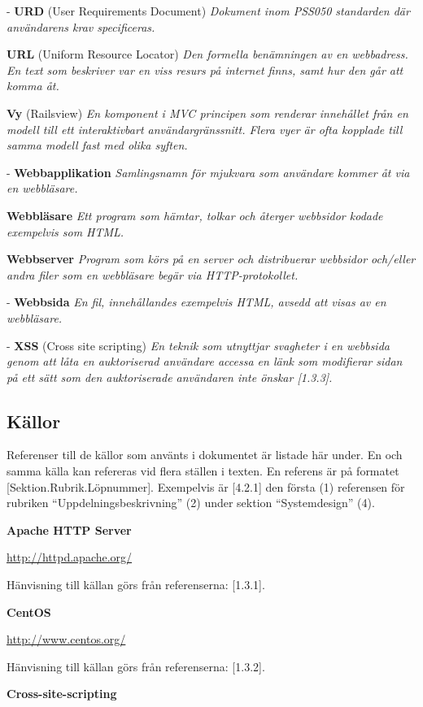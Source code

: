 \documentclass[a4paper, twoside, 11pt, titlepage]{article}
\begin{document}
	- \textbf{URD} (User Requirements Document) \emph{Dokument inom PSS050 standarden där användarens krav specificeras.}

	\textbf{URL} (Uniform Resource Locator) \emph{Den formella benämningen av en webbadress. En text som beskriver var en viss resurs på internet finns, samt hur den går att komma åt.}

	\textbf{Vy} (Railsview) \emph{En komponent i MVC principen som renderar innehållet från en modell till ett interaktivbart användargränssnitt. Flera vyer är ofta kopplade till samma modell fast med olika syften.}

	- \textbf{Webbapplikation} \emph{Samlingsnamn för mjukvara som användare kommer åt via en webbläsare.}

	\textbf{Webbläsare} \emph{Ett program som hämtar, tolkar och återger webbsidor kodade exempelvis som HTML.}

	\textbf{Webbserver} \emph{Program som körs på en server och distribuerar webbsidor och/eller andra filer som en webbläsare begär via HTTP-protokollet.}

	- \textbf{Webbsida} \emph{En fil, innehållandes exempelvis HTML, avsedd att visas av en webbläsare.}

	- \textbf{XSS} (Cross site scripting) \emph{En teknik som utnyttjar svagheter i en webbsida genom att låta en auktoriserad användare accessa en länk som modifierar sidan på ett sätt som den auktoriserade användaren inte önskar [1.3.3].}

	\subsection{Källor}


	Referenser till de källor som använts i dokumentet är listade här under. En och samma källa kan refereras vid flera ställen i texten. En referens är på formatet [Sektion.Rubrik.Löpnummer]. Exempelvis är [4.2.1] den första (1) referensen för rubriken ``Uppdelningsbeskrivning'' (2) under sektion ``Systemdesign'' (4).

	\textbf{Apache HTTP Server}

	\url{http://httpd.apache.org/}

	Hänvisning till källan görs från referenserna: [1.3.1].

	\textbf{CentOS}

	\url{http://www.centos.org/}

	Hänvisning till källan görs från referenserna: [1.3.2].

	\textbf{Cross-site-scripting}
\end{document}
